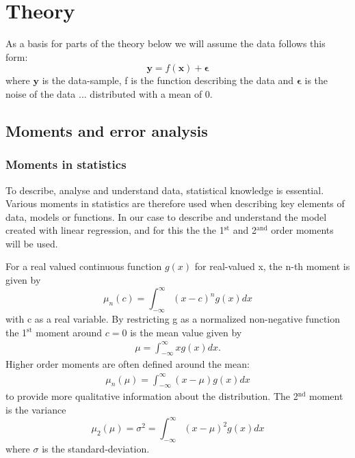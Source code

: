 \documentclass[uio,jmp,amsmath,amssymb,reprint]{revtex4-1}
\numberwithin{equation}{section}
\newcommand{\infint}{\int_{-\infty}^\infty}
\begin{document}


\section{Theory}\label{sec:Theory}

As a basis for parts of the theory below we will assume the data follows this form:
\begin{equation}\label{eq:01}
    \bm{y} = f(\bm{x}) + \bm{\epsilon}
\end{equation}
where \(\bm{y}\) is the data-sample, f is the function describing the data and \(\bm{\epsilon}\) is the noise of the data ... distributed with a mean of 0.

\subsection{Moments and error analysis}

\subsubsection{Moments in statistics}

To describe, analyse and understand data, statistical knowledge is essential. Various moments in statistics are therefore used when describing key elements of data, models or functions. In our case to describe and understand the model created with linear regression, and for this the the 1\(^\text{st}\) and 2\(^\text{and}\) order moments will be used.

For a real valued continuous function \(g(x)\) for real-valued x, the n-th moment is given by
\begin{equation}
    \mu_n(c) = \infint (x-c)^ng(x)dx
\end{equation}
with c as a real variable. By restricting g as a normalized non-negative function the 1\(^\text{st}\) moment around \(c=0\) is the mean value given by
\begin{align}
    \mu = \infint xg(x)dx.
\end{align}
Higher order moments are often defined around the mean:
\begin{align}
    \mu_n(\mu) = \infint (x-\mu)g(x)dx
\end{align}
to provide more qualitative information about the distribution. The 2\(^\text{nd}\) moment is the variance
\begin{equation}
    \mu_2(\mu) = \sigma^2 = \infint (x-\mu)^2g(x)dx
\end{equation}
where \(\sigma\) is the standard-deviation.
\end{document}
